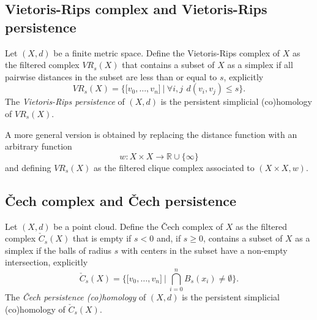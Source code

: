 \documentclass{amsart}
\begin{document}
	\subsection*{Vietoris-Rips complex and Vietoris-Rips persistence} \label{vietoris-rips_complex_and_vietoris-rips_persistence}
	
	Let $(X, d)$ be a 
	finite metric space. Define the Vietoris-Rips complex of $X$ as the
	filtered complex $VR_s(X)$ that contains a subset of $X$ as a simplex if all pairwise distances in the subset are less than or equal to $s$, explicitly
	\begin{equation*}
	VR_s(X) = \Big\{ \lbrack v_0,\dots,v_n \rbrack \ \Big|\ \forall i,j\ \,d(v_i, v_j) \leq s \Big\}.
	\end{equation*}
	The \textit{Vietoris-Rips persistence} of $(X, d)$ is the 
	persistent simplicial (co)homology of $VR_s(X)$.
	
	A more general version is obtained by replacing the distance function with an arbitrary function
	\begin{equation*}
	w : X \times X \to \mathbb R \cup \{\infty\}
	\end{equation*}
	and defining $VR_s(X)$ as the 
	filtered clique complex associated to $(X \times X ,w)$.
	
	
	\subsection*{\v{C}ech complex and \v{C}ech persistence} \label{cech_complex_and_cech_persistence}
	
	Let $(X, d)$ be a 
	point cloud. Define the \v{C}ech complex of $X$ as the 
	filtered complex $\check{C}_s(X)$ that is empty if $s<0$ and, if $s \geq 0$, contains a subset of $X$ as a simplex if the balls of radius $s$ with centers in the subset have a non-empty intersection, explicitly
	\begin{equation*}
	\check{C}_s(X) = \Big\{ \lbrack v_0,\dots,v_n \rbrack \ \Big|\ \bigcap_{i=0}^n B_s(x_i) \neq \emptyset \Big\}.
	\end{equation*}
	The \textit{\v Cech persistence (co)homology} of $(X,d)$ is the 
	persistent simplicial (co)homology of $\check{C}_s(X)$.
	
\end{document}
